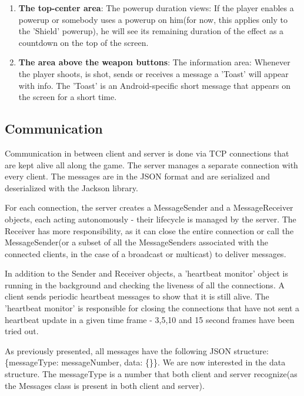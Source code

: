 \begin{enumerate}
  \item \textbf{The top-center area}: The powerup duration views: If the player
  enables a powerup or somebody uses a powerup on him(for now, this applies only
  to the 'Shield' powerup), he will see its remaining duration of the effect
  as a countdown on the top of the screen.
  
  \item \textbf{The area above the weapon buttons}: The information area:
  Whenever the player shoots, is shot, sends or receives a message a 'Toast'
  will appear with info. The 'Toast' is an Android-specific short message that
  appears on the screen for a short time.
  
\end{enumerate}


\subsection{Communication}

Communication in between client and server is done via TCP connections that are
kept alive all along the game. The server manages a separate connection with
every client. The messages are in the JSON format and are serialized and
deserialized with the Jackson library.\newline

For each connection, the server creates a MessageSender and a MessageReceiver
objects, each acting autonomously - their lifecycle is managed by the server.
The Receiver has more responsibility, as it can close the entire connection
or call the MessageSender(or a subset of all the MessageSenders associated with
the connected clients, in the case of a broadcast or multicast) to deliver
messages.\newline

In addition to the Sender and Receiver objects, a 'heartbeat monitor' object is
running in the background and checking the liveness of all the connections. A
client sends periodic heartbeat messages to show that it is still alive. The
'heartbeat monitor' is responsible for closing the connections that have not
sent a heartbeat update in a given time frame - 3,5,10 and 15 second frames have
been tried out.\newline

As previously presented, all messages have the following JSON structure:
\{messageType: messageNumber, data: \{\}\}. We are now interested in the data
structure. The messageType is a number that both client and server recognize(as
the Messages class is present in both client and server).\newline

